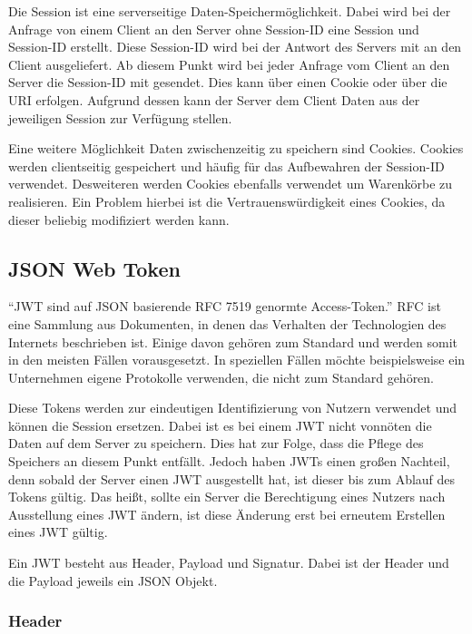 Die Session ist eine serverseitige Daten-Speichermöglichkeit. Dabei wird bei der Anfrage von einem Client an den Server ohne Session-ID eine Session und Session-ID erstellt. Diese Session-ID wird bei der Antwort des Servers mit an den Client ausgeliefert. Ab diesem Punkt wird bei jeder Anfrage vom Client an den Server die Session-ID mit gesendet. Dies kann über einen Cookie oder über die \gls{URI} erfolgen. Aufgrund dessen kann der Server dem Client Daten aus der jeweiligen Session zur Verfügung stellen.

Eine weitere Möglichkeit Daten zwischenzeitig zu speichern sind Cookies. Cookies werden clientseitig gespeichert und häufig für das Aufbewahren der Session-ID verwendet. Desweiteren werden Cookies ebenfalls verwendet um Warenkörbe zu realisieren. Ein Problem hierbei ist die Vertrauenswürdigkeit eines Cookies, da dieser beliebig modifiziert werden kann.

\subsection{JSON Web Token}
\label{sec: jwt}
\enquote{\gls{JWT} sind auf \gls{JSON} basierende \gls{RFC} 7519 genormte Access-Token.} \gls{RFC} ist eine Sammlung aus Dokumenten, in denen das Verhalten der Technologien des Internets beschrieben ist. Einige davon gehören zum Standard und werden somit in den meisten Fällen vorausgesetzt. In speziellen Fällen möchte beispielsweise ein Unternehmen eigene Protokolle verwenden, die nicht zum Standard gehören.

Diese Tokens werden zur eindeutigen Identifizierung von Nutzern verwendet und können die Session ersetzen. Dabei ist es bei einem \gls{JWT} nicht vonnöten die Daten auf dem Server zu speichern. Dies hat zur Folge, dass die Pflege des Speichers an diesem Punkt entfällt. Jedoch haben \gls{JWT}s einen gro{\ss}en Nachteil, denn sobald der Server einen \gls{JWT} ausgestellt hat, ist dieser bis zum Ablauf des Tokens gültig. Das hei{\ss}t, sollte ein Server die Berechtigung eines Nutzers nach Ausstellung eines \gls{JWT} ändern, ist diese Änderung erst bei erneutem Erstellen eines \gls{JWT} gültig.

Ein \gls{JWT} besteht aus Header, Payload und Signatur. Dabei ist der Header und die Payload jeweils ein \gls{JSON} Objekt.

\subsubsection{Header}
\label{sec: jwt_header}

